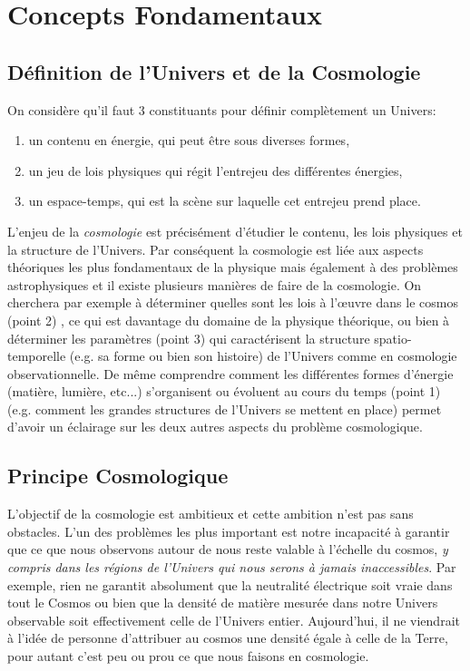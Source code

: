 
\chapter{Concepts Fondamentaux}

\section{Définition de l'Univers et de la Cosmologie}
\label{s:fond_def}
 On considère qu'il faut 3 constituants pour définir complètement un Univers:
\begin{enumerate}
\item un contenu en énergie, qui peut être sous diverses formes,
\item un jeu de lois physiques qui régit l'entrejeu des différentes énergies,
\item un espace-temps, qui est la scène sur laquelle cet entrejeu prend place.
\end{enumerate} 
L'enjeu de la \textit{cosmologie} est précisément d'étudier le contenu, les lois physiques et la structure de l'Univers. Par conséquent la cosmologie est liée aux aspects théoriques les plus fondamentaux de la physique mais également à des problèmes astrophysiques et il existe plusieurs manières de faire de la cosmologie. On cherchera par exemple à déterminer quelles sont les lois à l'œuvre dans le cosmos (point 2) , ce qui est davantage du domaine de la physique théorique, ou bien à déterminer les paramètres (point 3)  qui caractérisent la structure spatio-temporelle (e.g. sa forme ou bien son histoire) de l'Univers comme en cosmologie observationnelle. De même comprendre comment les différentes formes d'énergie (matière, lumière, etc...) s'organisent ou évoluent au cours du temps (point 1) (e.g. comment les grandes structures de l'Univers se mettent en place) permet d'avoir un éclairage sur les deux autres aspects du problème cosmologique.

\section{Principe Cosmologique}
L'objectif de la cosmologie est ambitieux et cette ambition n'est pas sans obstacles. L'un des problèmes les plus important est notre incapacité à garantir que ce que nous observons autour de nous reste valable à l'échelle du cosmos, \textit{y compris dans les régions de l'Univers qui nous serons à jamais inaccessibles}. Par exemple, rien ne garantit absolument que la neutralité électrique soit vraie dans tout le Cosmos ou bien que la densité de matière mesurée dans notre Univers observable soit effectivement celle de l'Univers entier. Aujourd'hui, il ne viendrait à l'idée de personne d'attribuer au cosmos une densité égale à celle de la Terre, pour autant c'est peu ou prou ce que nous faisons en cosmologie. 

